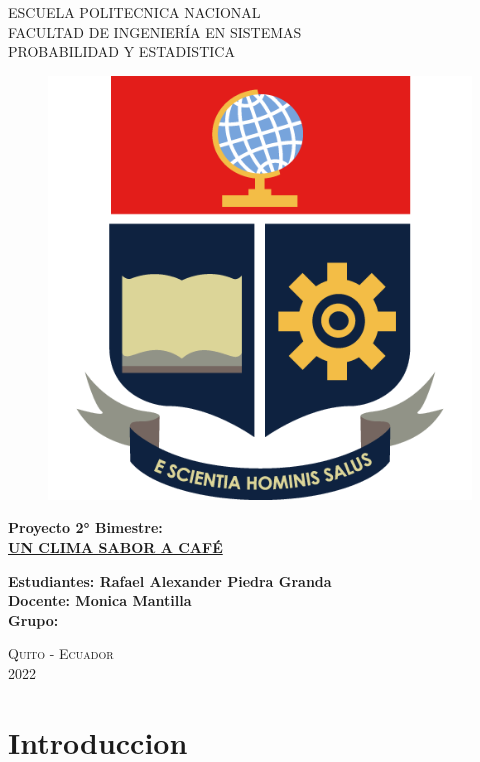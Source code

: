 \documentclass{article}
\begin{document}
\begin{center} \LARGE{ESCUELA POLITECNICA NACIONAL} \\[0.5cm] \Large{FACULTAD DE INGENIERÍA EN SISTEMAS}\\[0.5cm] \large{PROBABILIDAD Y ESTADISTICA} \end{center}
\begin{figure}[htb] \centering \includegraphics[scale=.6]{descarga (1).png}\end{figure}
\begin{center} \large{\bf Proyecto 2° Bimestre:}\\ \vspace{.25cm} { \Large \bfseries \underline{UN CLIMA SABOR A CAFÉ}} \\ \end{center}
\large{\bf Estudiantes: Rafael Alexander Piedra Granda }\\
\large{\bf Docente: Monica Mantilla }\\
\large{\bf Grupo: }\\\begin{center} \Large \textsc{Quito - Ecuador} \\
\Large \textsc{2022}
\end{center}
\section{Introduccion}
\end{document}

